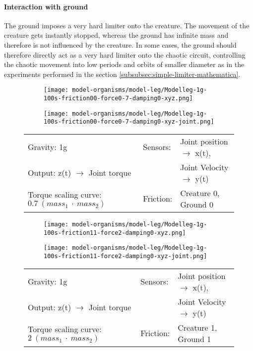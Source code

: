 \documentclass[main]{subfiles}
\begin{document}
\paragraph{Interaction with ground} The ground imposes a very hard limiter onto the creature. The movement of the creature gets instantly stopped, whereas the ground has infinite mass and therefore is not influenced by the creature. In some cases, the ground should therefore directly act as a very hard limiter onto the chaotic circuit, controlling the chaotic movement into low periods and orbits of smaller diameter as in the experiments performed in the section \ref{subsubsec:simple-limiter-mathematica}. 

\begin{figure}[H]
	\centering
		\begin{subfigure}[c]{0.45\textwidth}
	\texttt{[image: model-organisms/model-leg/Modelleg-1g-100s-friction00-force0-7-damping0-xyz.png]}
		\end{subfigure}
	\begin{subfigure}[c]{0.45\textwidth}
	\texttt{[image: model-organisms/model-leg/Modelleg-1g-100s-friction00-force0-7-damping0-xyz-joint.png]}
		\end{subfigure}
	\caption[Limited chaotic controller controlling model leg]{}
	\begin{tabular}{l|ll}
	\hline 
	Gravity: 1g  & Sensors: & Joint position \(\rightarrow\) x(t),\\
	 Output: z(t) \(\rightarrow\) Joint torque &  & Joint Velocity \(\rightarrow\) y(t) \\
	  Torque scaling curve: \(0.7~(mass_1~\cdot~mass_2)\) & Friction: & Creature 0, Ground 0 \\
	  \hline
	\end{tabular}
	
	\label{figure:limited-damped-model-leg-collision1}
\end{figure}

\begin{figure}[H]
	\centering
		\begin{subfigure}[c]{0.45\textwidth}
	\texttt{[image: model-organisms/model-leg/Modelleg-1g-100s-friction11-force2-damping0-xyz.png]}
		\end{subfigure}
	\begin{subfigure}[c]{0.45\textwidth}
	\texttt{[image: model-organisms/model-leg/Modelleg-1g-100s-friction11-force2-damping0-xyz-joint.png]}
		\end{subfigure}
	\caption[Limited chaotic controller controlling model leg]{}
	\begin{tabular}{l|ll}
	\hline 
	Gravity: 1g  & Sensors: & Joint position \(\rightarrow\) x(t),\\
	 Output: z(t) \(\rightarrow\) Joint torque &  & Joint Velocity \(\rightarrow\) y(t) \\
	  Torque scaling curve: \(2~(mass_1~\cdot~mass_2)\) & Friction: & Creature 1, Ground 1 \\
	  \hline
	\end{tabular}

	\label{figure:limited-damped-model-leg-collision2}
\end{figure}
\end{document}

